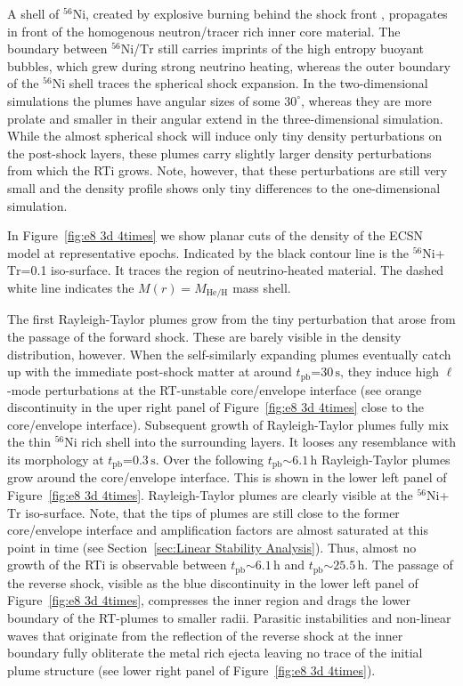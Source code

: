 \documentclass[fleqn,usenatbib]{mnras}
\newcommand{\tpb}{\ensuremath{t_{\text{pb}}}}
\newcommand{\nickel}{\ensuremath{\mathrm{^{56}Ni}}\xspace}
\newcommand{\tracer}{\ensuremath{\mathrm{Tr}}\xspace}
\newcommand{\s}{\ensuremath{\text{s}}}
\begin{document}
A shell of \nickel, created by explosive burning behind the shock front \citep{Kifonidis2006}, propagates in front of the homogenous neutron/tracer rich inner core material. The boundary between \nickel/\tracer still carries imprints of the high entropy buoyant bubbles, which grew during strong neutrino heating, whereas the outer boundary of the \nickel shell traces the spherical shock expansion. In the two-dimensional simulations the plumes have angular sizes of some $30^{\circ}$, whereas they are more prolate and smaller in their angular extend in the three-dimensional simulation. 
While the almost spherical shock will induce only tiny density perturbations on the post-shock layers, these plumes carry slightly larger density perturbations from which the RTi grows. Note, however, that these perturbations are still very small and the density profile shows only tiny differences to the one-dimensional simulation.

In Figure~\ref{fig:e8 3d 4times} we show planar cuts of the density of the ECSN model at representative epochs. Indicated by the black contour line is the \nickel+\tracer=0.1 iso-surface. It traces the region of neutrino-heated material. The dashed white line indicates the $M(r)=M_{\mathrm{He/H}}$ mass shell.

The first Rayleigh-Taylor plumes grow from the tiny perturbation that arose from the passage of the forward shock. These are barely visible in the density distribution, however. 
When the self-similarly expanding plumes eventually catch up with the immediate post-shock matter at around $\tpb\mathord{=}30\,\s$, they induce high $\ell$-mode perturbations at the RT-unstable core/envelope interface (see orange discontinuity in the uper right panel of Figure~\ref{fig:e8 3d 4times} close to the core/envelope interface). 
Subsequent growth of Rayleigh-Taylor plumes fully mix the thin \nickel rich shell into the surrounding layers. It looses any resemblance with its morphology at $\tpb\mathord{=}0.3\,\s$. 
Over the following $\tpb\mathord{\sim}6.1\,\text{h}$ Rayleigh-Taylor plumes grow around the core/envelope interface. This is shown in the lower left panel of Figure~\ref{fig:e8 3d 4times}.
Rayleigh-Taylor plumes are clearly visible at the \nickel+\tracer iso-surface.
Note, that the tips of plumes are still close to the former core/envelope interface and amplification factors are almost saturated at this point in time (see Section~\ref{sec:Linear Stability Analysis}). Thus, almost no growth of the RTi is observable between $\tpb\mathord{\sim} 6.1\,\text{h}$ and  $\tpb\mathord{\sim} 25.5\,\text{h}$.
The passage of the reverse shock, visible as the blue discontinuity in the lower left panel of Figure~\ref{fig:e8 3d 4times}, compresses the inner region and drags the lower boundary of the RT-plumes to smaller radii. Parasitic instabilities and non-linear waves that originate from the reflection of the reverse shock at the inner boundary fully obliterate the metal rich ejecta leaving no trace of the initial plume structure (see lower right panel of Figure~\ref{fig:e8 3d 4times}). 
\end{document}
